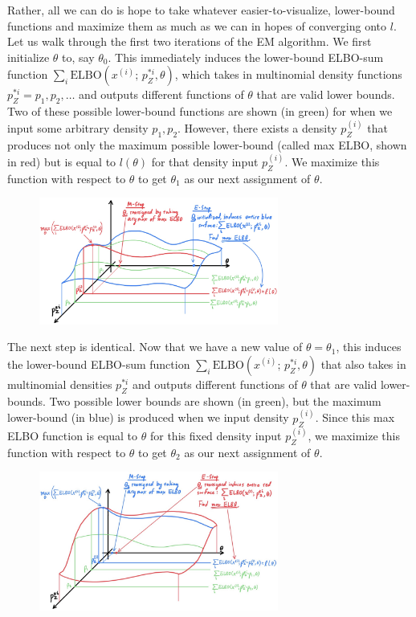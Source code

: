 \documentclass{article}
\begin{document}
  Rather, all we can do is hope to take whatever easier-to-visualize, lower-bound functions and maximize them as much as we can in hopes of converging onto $l$. Let us walk through the first two iterations of the EM algorithm. We first initialize $\theta$ to, say $\theta_0$. This immediately induces the lower-bound ELBO-sum function $\sum_{i} \text{ELBO} (x^{(i)};\, p_Z^{*i}, \theta)$, which takes in multinomial density functions $p_Z^{*i} = p_1, p_2, \ldots$ and outputs different functions of $\theta$ that are valid lower bounds. Two of these possible lower-bound functions are shown (in green) for when we input some arbitrary density $p_1, p_2$. However, there exists a density $p_Z^{(i)}$ that produces not only the maximum possible lower-bound (called max ELBO, shown in red) but is equal to $l(\theta)$ for that density input $p_Z^{(i)}$. We maximize this function with respect to $\theta$ to get $\theta_1$ as our next assignment of $\theta$. 

  \begin{figure}[H]
    \centering 
    \includegraphics[width=0.7\textwidth]{img/EM_first_iteration.jpg}
    \caption{} 
    \label{fig:EM_first_iteration}
  \end{figure}

  The next step is identical. Now that we have a new value of $\theta = \theta_1$, this induces the lower-bound ELBO-sum function $\sum_{i} \text{ELBO} (x^{(i)};\, p_Z^{*i}, \theta)$ that also takes in multinomial densities $p_Z^{*i}$ and outputs different functions of $\theta$ that are valid lower-bounds. Two possible lower bounds are shown (in green), but the maximum lower-bound (in blue) is produced when we input density $p_Z^{(i)}$. Since this max ELBO function is equal to $\theta$ for this fixed density input $p_Z^{(i)}$, we maximize this function with respect to $\theta$ to get $\theta_2$ as our next assignment of $\theta$. 

  \begin{figure}[H]
    \centering 
    \includegraphics[width=0.7\textwidth]{img/EM_second_iteration.jpg}
    \caption{} 
    \label{fig:EM_second_iteration}
  \end{figure}
\end{document}
